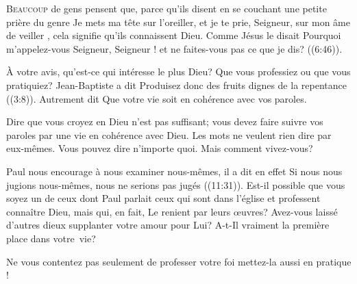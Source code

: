 \lettrine{B}{eaucoup} de gens pensent que,
 parce qu'ils disent en se couchant une petite prière
 du genre\frcolon{} 
 \Og Je mets ma tête sur l'oreiller, et je te prie, Seigneur,
 sur mon âme de veiller \Fg{}, cela signifie qu'ils connaissent Dieu.
 Comme Jésus le disait\frcolon{} 
 \Og Pourquoi m'appelez-vous\frcolon{} Seigneur, Seigneur !
 et ne faites-vous pas ce que je dis? \Fg{} ((6:46)).

À votre avis, qu'est-ce qui intéresse le plus Dieu?
 Que vous professiez ou que vous pratiquiez?
 Jean-Baptiste a dit\frcolon{} 
 \Og Produisez donc des fruits dignes de la repentance \Fg{}
 ((3:8)).
 Autrement dit\frcolon{} 
 \Og Que votre vie soit en cohérence avec vos paroles. \Fg{}


Dire que vous croyez en Dieu n'est pas suffisant;
 vous devez faire suivre vos paroles par une vie en cohérence avec Dieu.
 Les mots ne veulent rien dire par eux-mêmes. Vous pouvez dire n'importe quoi.
 Mais  comment vivez-vous? 

Paul nous encourage à nous examiner nous-mêmes,
 il a dit en effet\frcolon{} 
 \Og Si nous nous jugions nous-mêmes, nous ne serions pas jugés \Fg{}
 ((11:31)).
 Est-il possible que vous soyez un de ceux dont Paul parlait
 \ocadr ceux qui sont dans l'église et professent connaître Dieu, mais qui,
 en fait, Le renient par leurs \oe{}uvres? Avez-vous laissé d'autres dieux
 supplanter votre amour pour Lui?
 A-t-Il vraiment la première place dans votre~vie? 

Ne vous contentez pas seulement de professer votre foi
 \ocadr mettez-la 
 aussi en pratique ! 

\dvrule






